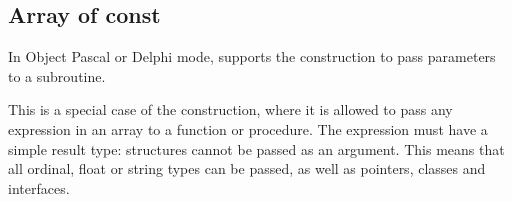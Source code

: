 \subsection{Array of const}
In Object Pascal or Delphi mode, \fpc supports the 
construction to pass parameters to a subroutine.

This is a special case of the  construction, where it is
allowed to pass any expression in an array to a function or procedure. 
The expression must have a simple result type: structures cannot be passed
as an argument. This means that all ordinal, float or string types can be
passed, as well as pointers, classes and interfaces.

